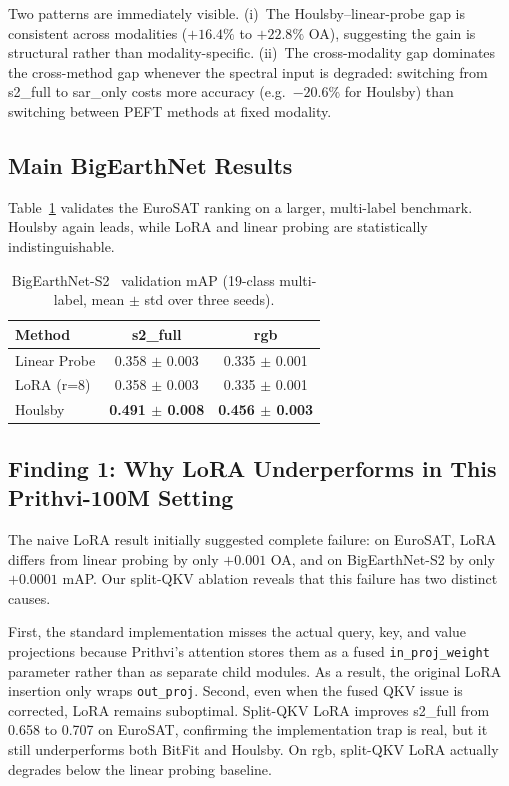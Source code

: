 Two patterns are immediately visible. (i)~The Houlsby--linear-probe gap is consistent across modalities ($+16.4\%$ to $+22.8\%$ OA), suggesting the gain is structural rather than modality-specific. (ii)~The cross-modality gap dominates the cross-method gap whenever the spectral input is degraded: switching from s2\_full to sar\_only costs more accuracy (e.g.~$-20.6\%$ for Houlsby) than switching between PEFT methods at fixed modality.

\subsection{Main BigEarthNet Results}
Table~\ref{tab:bigearthnet-main} validates the EuroSAT ranking on a larger, multi-label benchmark. Houlsby again leads, while LoRA and linear probing are statistically indistinguishable.

\begin{table}[t]
\centering
\caption{BigEarthNet-S2~\cite{sumbul2019bigearthnet} validation mAP (19-class multi-label, mean $\pm$ std over three seeds).}
\label{tab:bigearthnet-main}
\begin{tabular}{lcc}
\toprule
Method & s2\_full & rgb \\
\midrule
Linear Probe & 0.358 $\pm$ 0.003 & 0.335 $\pm$ 0.001 \\
LoRA (r=8) & 0.358 $\pm$ 0.003 & 0.335 $\pm$ 0.001 \\
Houlsby & \textbf{0.491 $\pm$ 0.008} & \textbf{0.456 $\pm$ 0.003} \\
\bottomrule
\end{tabular}
\end{table}

\subsection{Finding 1: Why LoRA Underperforms in This Prithvi-100M Setting}
The naive LoRA result initially suggested complete failure: on EuroSAT, LoRA differs from linear probing by only $+0.001$ OA, and on BigEarthNet-S2 by only $+0.0001$ mAP. Our split-QKV ablation reveals that this failure has two distinct causes.

First, the standard implementation misses the actual query, key, and value projections because Prithvi's attention stores them as a fused \texttt{in\_proj\_weight} parameter rather than as separate child modules. As a result, the original LoRA insertion only wraps \texttt{out\_proj}. Second, even when the fused QKV issue is corrected, LoRA remains suboptimal. Split-QKV LoRA improves s2\_full from 0.658 to 0.707 on EuroSAT, confirming the implementation trap is real, but it still underperforms both BitFit and Houlsby. On rgb, split-QKV LoRA actually degrades below the linear probing baseline.

